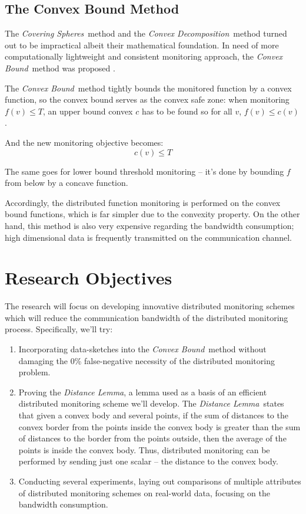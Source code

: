 \documentclass[11pt, conference]{article}
\newcommand{\distanceLemma}{\textit{Distance Lemma}}
\newcommand{\coveringSpheres}{\textit{Covering Spheres}}
\newcommand{\convexDecomposition}{\textit{Convex Decomposition}}
\newcommand{\convexBound}{\textit{Convex Bound}}
\begin{document}
\subsection{The Convex Bound Method}

The \coveringSpheres \ method and the \convexDecomposition \ method turned out to be impractical albeit their mathematical foundation. In need of more computationally lightweight and consistent monitoring approach, the \convexBound \ method was proposed \cite{lazerson2018lightweight}.

The \convexBound \ method tightly bounds the monitored function by a convex function, so the convex bound serves as the convex safe zone: when monitoring $f(v) \leq T$, an upper bound convex $c$ has to be found so for all $v$, $f(v) \leq  c(v)$.

And the new monitoring objective becomes:
\begin{equation}
\label{monitoringConstraint}
c(v) \leq T
\end{equation}

The same goes for lower bound threshold monitoring -- it's done by bounding $f$ from below by a concave function.

Accordingly, the distributed function monitoring is performed on the convex bound functions, which is far simpler due to the convexity property. On the other hand, this method is also very expensive regarding the bandwidth consumption; high dimensional data is frequently transmitted on the communication channel.

\section{Research Objectives}

The research will focus on developing innovative distributed monitoring schemes which will reduce the communication bandwidth of the distributed monitoring process. Specifically, we'll try:

\begin{enumerate}
\item Incorporating data-sketches into the \convexBound \ method without damaging the 0\% false-negative necessity of the distributed monitoring problem.

\item Proving the \distanceLemma , a lemma used as a basis of an efficient distributed monitoring scheme we'll develop. The \distanceLemma \ states that given a convex body and several points, if the sum of distances to the convex border from the points inside the convex body is greater than the sum of distances to the border from the points outside, then the average of the points is inside the convex body. Thus, distributed monitoring can be performed by sending just one scalar -- the distance to the convex body.

\item Conducting several experiments, laying out comparisons of multiple attributes of distributed monitoring schemes on real-world data, focusing on the bandwidth consumption.
\end{enumerate}



	
\end{document}

